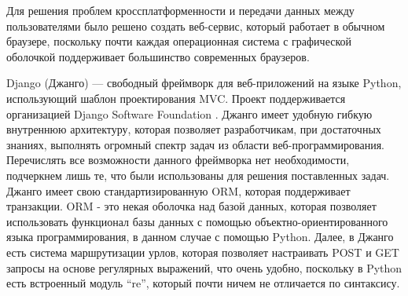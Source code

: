Для решения проблем кроссплатформенности и передачи данных между пользователями было решено создать веб-сервис,
который работает в обычном браузере, поскольку почти каждая операционная система с графической оболочкой
поддерживает большинство современных браузеров.

Django (Джанго) — свободный фреймворк для веб-приложений на языке Python, использующий шаблон проектирования MVC.
Проект поддерживается организацией Django Software Foundation \cite{Django}. Джанго имеет удобную гибкую
внутреннюю архитектуру, которая позволяет разработчикам, при достаточных знаниях, выполнять огромный спектр задач
из области веб-программирования. Перечислять все возможности данного фреймворка нет необходимости, подчеркнем лишь те,
что были использованы для решения поставленных задач. Джанго имеет свою стандартизированную ORM, которая поддерживает
транзакции. ORM - это некая оболочка над базой данных,  которая позволяет использовать функционал базы данных
с помощью объектно-ориентированного языка программирования, в данном случае с помощью Python. Далее, в Джанго есть
система маршрутизации урлов, которая позволяет настраивать POST и GET запросы на основе регулярных выражений,
что очень удобно, поскольку в Python есть встроенный модуль “re”, который почти ничем не отличается по синтаксису.